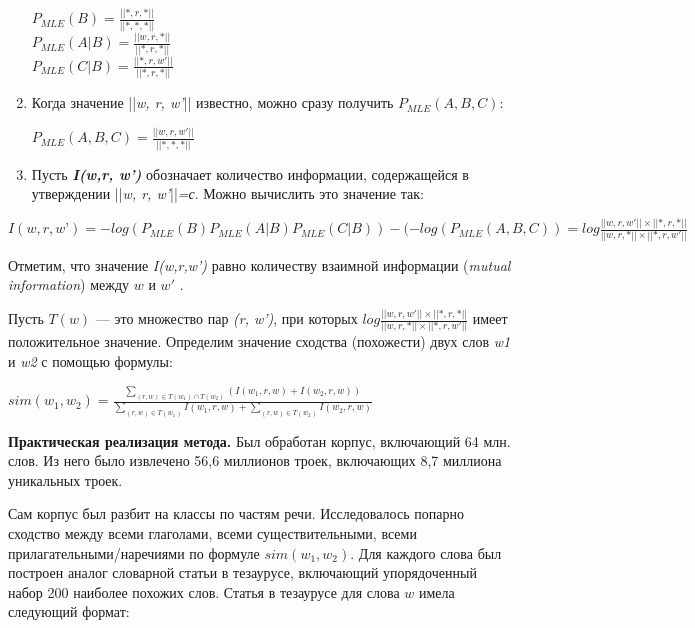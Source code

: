 \documentclass{article}
\begin{document}
\begin{articletext}
\begin{enumerate}
$P_{MLE}(B)=\frac{||*,r,*||}{||*,*,*||}$\\
$P_{MLE}(A|B)=\frac{||w,r,*||}{||*,r,*||}$\\
$P_{MLE}(C|B)=\frac{||*,r,w'||}{||*,r,*||}$

\item Когда значение ||\textit{w, r, w’}|| известно, можно сразу получить $P_{MLE}(A,B,C)$:

$P_{MLE}(A,B,C)=\frac{||w,r,w'||}{||*,*,*||}$
\item Пусть \textit{\textbf{I(w,r, w’)}} обозначает количество информации, содержащейся 
в утверждении ||\textit{w, r, w'}||\textit{=с}. Можно вычислить это значение так:

\end{enumerate}

\bfullwidth
\begin{center}
$I(w,r,w’)=-log(P_{MLE}(B) P_{MLE} (A|B) P_{MLE} (C|B))-(-log(P_{MLE}(A,B,C))=log\frac{||w,r,w'||\times||*,r,*||}{||w,r,*||\times||*,r,w'||}$
\end{center}
\efullwidth

Отметим, что значение \textit{I(w,r,w’)} равно количеству взаимной информации (\textit{mutual information}) между $w$ и $w'$ \cite{Donald 1990}.

Пусть $T(w)$ --– это множество пар \textit{(r, w')}, при которых $log\frac{||w,r,w'||\times||*,r,*||}{||w,r,*||\times||*,r,w'||}$ имеет положительное значение. Определим значение сходства (похожести) двух слов \textit{w1} и \textit{w2} с помощью формулы:

\bfullwidth
\begin{center}
$sim(w_1,w_2)=\frac{\sum_{(r,w)\in T(w_1)\cap T(w_2)}(I(w_1,r,w)+I(w_2,r,w))}{\sum_{(r,w)\in T(w_1)}I(w_1,r,w)+\sum_{(r,w)\in T(w_2)}I(w_2,r,w)}$
\end{center}
\efullwidth

\textbf{Практическая реализация метода.} Был обработан корпус, включающий 64 млн. слов. Из него было извлечено 56,6 миллионов троек, включающих 8,7 миллиона уникальных троек.

Сам корпус был разбит на классы по частям речи.  Исследовалось попарно сходство между всеми глаголами, всеми существительными, всеми прилагательными/наречиями по формуле $sim(w_1 , w_2)$. Для каждого слова был построен аналог словарной статьи в тезаурусе, включающий упорядоченный набор 200 наиболее похожих слов. Статья в тезаурусе для слова $w$ имела следующий формат:\\


\end{articletext}
\end{document}
